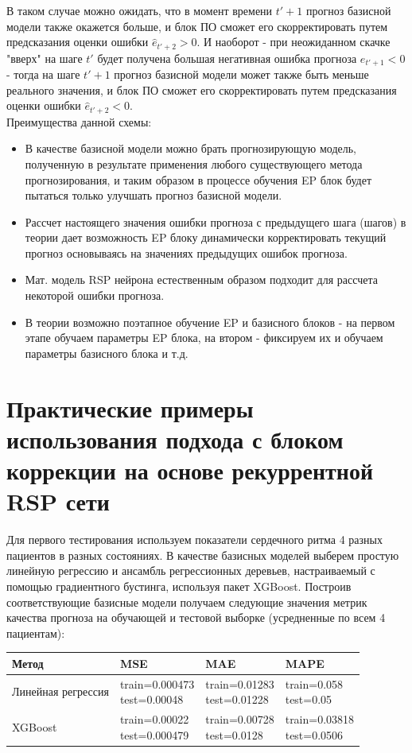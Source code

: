 \documentclass[11pt]{article}
\begin{document}
В таком случае можно ожидать, что в момент времени $t'+1$ прогноз базисной модели также окажется больше, и блок ПО сможет его скорректировать путем предсказания оценки ошибки $ \hat{e}_{t'+2} > 0$. И наоборот - при неожиданном скачке "вверх" на шаге $t'$ будет получена большая негативная ошибка прогноза $ e_{t'+1} < 0 $ - тогда на шаге $t'+1$ прогноз базисной модели может также быть меньше реального значения, и блок ПО сможет его скорректировать путем предсказания оценки ошибки $\hat{e}_{t'+2} < 0$.
\\ 
Преимущества данной схемы:
\begin{itemize}
\item В качестве базисной модели можно брать прогнозирующую модель, полученную в результате применения любого существующего метода прогнозирования, и таким образом в процессе обучения EP блок будет пытаться только улучшать прогноз базисной модели.
\item Рассчет настоящего значения ошибки прогноза с предыдущего шага (шагов) в теории дает возможность EP блоку динамически корректировать текущий прогноз основываясь на значениях предыдущих ошибок прогноза.
\item Мат. модель RSP нейрона естественным образом подходит для рассчета некоторой ошибки прогноза.
\item В теории возможно поэтапное обучение EP и базисного блоков - на первом этапе обучаем параметры EP блока, на втором - фиксируем их и обучаем параметры базисного блока и т.д.
\end{itemize}

\section*{Практические примеры использования подхода с блоком коррекции на основе рекуррентной RSP сети}
Для первого тестирования используем показатели сердечного ритма 4 разных пациентов в разных состояниях. В качестве базисных моделей выберем простую линейную регрессию и ансамбль регрессионных деревьев, настраиваемый с помощью градиентного бустинга, используя пакет XGBoost. Построив соответствующие базисные модели получаем следующие значения метрик качества прогноза на обучающей и тестовой выборке (усредненные по всем 4 пациентам):

\begin{tabular}{ |p{3cm}|p{3cm}|p{3cm}|p{3cm}|  }
 \hline
 Метод & MSE &  MAE & MAPE \\
 \hline
 Линейная регрессия &
 \makecell{train=0.000473 \\ test=0.00048} &
 \makecell{train=0.01283 \\ test=0.01228} &
 \makecell{train=0.058 \\ test=0.05} \\
 \hline
 XGBoost &
 \makecell{train=0.00022 \\ test=0.000479} &
 \makecell{train=0.00728 \\ test=0.0128} &
 \makecell{train=0.03818 \\ test=0.0506} \\
 \hline
\end{tabular}
\end{document}
